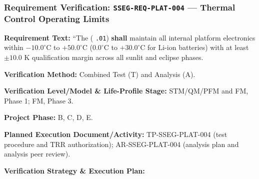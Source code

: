 \subsubsection{Requirement Verification: \texttt{SSEG-REQ-PLAT-004} --- Thermal Control Operating Limits}
\label{ver:SSEG-REQ-PLAT-004}
\textbf{Requirement Text:} ``The  ( \texttt{.01}) \textbf{shall} maintain all internal platform electronics within $-10.0^\circ\text{C}$ to $+50.0^\circ\text{C}$ ($0.0^\circ\text{C}$ to $+30.0^\circ\text{C}$ for $\mathrm{Li\text{-}ion}$ batteries) with at least $\pm 10.0\text{ K}$ qualification margin across all sunlit and eclipse phases.
\par\textbf{Verification Method:} Combined Test (T) and Analysis (A).
\par\textbf{Verification Level/Model \& Life-Profile Stage:} STM/QM/PFM and FM, Phase 1; FM, Phase 3.
\par\textbf{Project Phase:} B, C, D, E.
\par\textbf{Planned Execution Document/Activity:} TP-SSEG-PLAT-004 (test procedure and TRR authorization); AR-SSEG-PLAT-004 (analysis plan and analysis peer review).
\par\textbf{Verification Strategy \& Execution Plan:}

